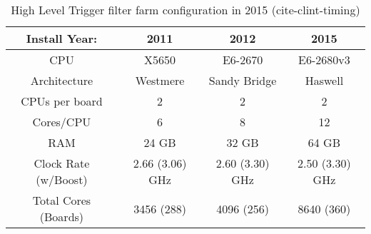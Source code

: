 \begin{center}
\begin{table}[]
\begin{center}
\caption{High Level Trigger filter farm configuration in 2015 (cite-clint-timing)}
\begin{tabular}{cccc}
Install Year: & 2011 & 2012 & 2015 \\  
\hline
CPU & X5650  & E6-2670  & E6-2680v3  \\
Architecture & Westmere  & Sandy Bridge & Haswell \\
CPUs per board & 2 & 2 & 2 \\
Cores/CPU & 6 & 8 & 12 \\
RAM & 24 GB & 32 GB & 64 GB \\
Clock Rate (w/Boost) & 2.66 (3.06) GHz & 2.60 (3.30) GHz & 2.50 (3.30) GHz \\

Total Cores (Boards) & 3456 (288) & 4096 (256) & 8640 (360) \\ 
\end{tabular}
\end{center}
\end{table}
\end{center}
